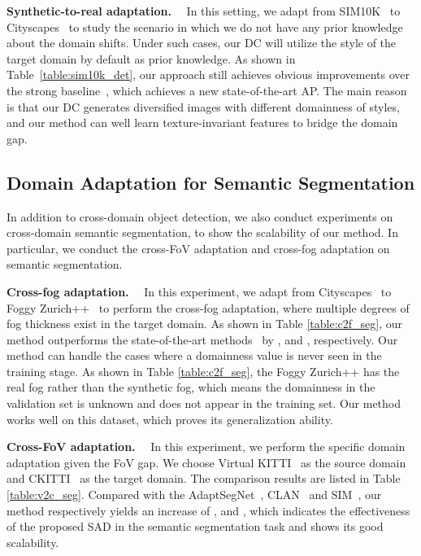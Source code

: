 \documentclass[10pt,journal,compsoc]{IEEEtran}
\renewcommand{\paragraph}[1]{\noindent\textbf{#1}~~}
\begin{document}
\paragraph{Synthetic-to-real adaptation.}
In this setting, we adapt from SIM10K~\cite{sim10k} to Cityscapes~\cite{cordts2016cityscapes} to study the scenario in which we do not have any prior knowledge about the domain shifts. Under such cases, our DC will utilize the style of the target domain by default as prior knowledge. As shown in Table~\ref{table:sim10k_det}, our approach still achieves obvious improvements over the strong baseline~\cite{GPA}, which achieves a new state-of-the-art  AP. 
The main reason is that our DC generates diversified images with different domainness of styles, and our method can well learn texture-invariant features to bridge the domain gap. 




\subsection{Domain Adaptation for Semantic Segmentation}
\label{sec:DASS}
In addition to cross-domain object detection, we also conduct experiments on cross-domain semantic segmentation, to show the scalability of our method. In particular, we conduct the cross-FoV adaptation and cross-fog adaptation on semantic segmentation.


\paragraph{Cross-fog adaptation.}
In this experiment, we adapt from Cityscapes~\cite{cordts2016cityscapes} to Foggy Zurich++~\cite{FoggyCity,FoggyDriving} to perform the cross-fog adaptation, where multiple degrees of fog thickness exist in the target domain. As shown in Table \ref{table:c2f_seg}, our method outperforms the state-of-the-art methods~\cite{AdaptSegNet,CLAN,SIM} by ,  and , respectively. 
Our method can handle the cases where a domainness value is never seen in the training stage. As shown in Table \ref{table:c2f_seg}, the Foggy Zurich++ has the real fog rather than the synthetic fog, which means the domainness in the validation set is unknown and does not appear in the training set. Our method works well on this dataset, which proves its generalization ability. 

\paragraph{Cross-FoV adaptation.}
In this experiment, we perform the specific domain adaptation given the FoV gap. We choose Virtual KITTI~\cite{VKITTI} as the source domain and CKITTI~\cite{kITTI,cordts2016cityscapes} as the target domain. The comparison results are listed in Table \ref{table:v2c_seg}. Compared with the AdaptSegNet~\cite{AdaptSegNet}, CLAN~\cite{CLAN} and SIM~\cite{SIM}, our method respectively yields an increase of ,  and , which indicates the effectiveness of the proposed SAD in the semantic segmentation task and shows its good scalability.
\end{document}
